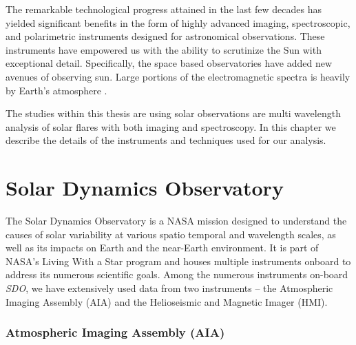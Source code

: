 


\justifying

The remarkable technological progress attained in the last few decades has yielded significant benefits in the form of highly advanced imaging, spectroscopic, and polarimetric instruments designed for astronomical observations. These instruments have empowered us with the ability to scrutinize the Sun with exceptional detail. Specifically, the space based observatories have added new avenues of observing sun. Large portions of the electromagnetic spectra is heavily by Earth's atmosphere .  

The studies within this thesis are using solar observations are multi wavelength analysis of solar flares with both imaging and spectroscopy. In this chapter we describe the details of the instruments and techniques used for our analysis.

\section{Solar Dynamics Observatory}

The Solar Dynamics Observatory \citep[SDO;][]{sdo} is a NASA mission designed to understand the causes of solar variability at various spatio temporal and wavelength scales, as well as its impacts on Earth and the near-Earth environment. It is part of NASA’s Living With a Star program and houses multiple instruments onboard to address its numerous scientific goals. Among the numerous instruments on-board {\it SDO}, we have extensively used data from two instruments – the Atmospheric Imaging Assembly (AIA) and the Helioseismic and Magnetic Imager (HMI).

\subsubsection{Atmospheric Imaging Assembly (AIA)}

